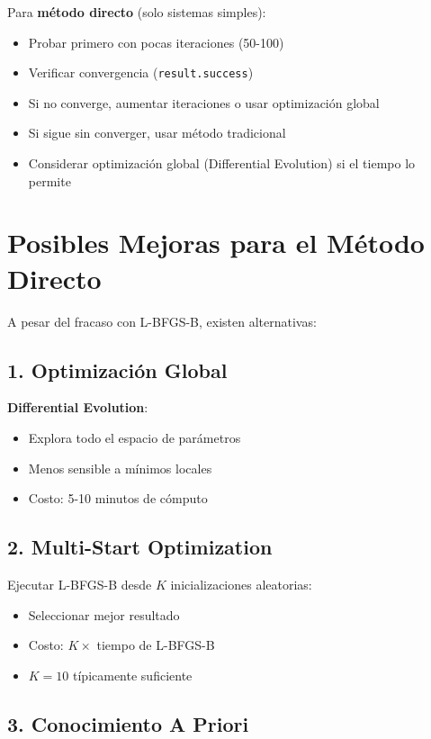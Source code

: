 \documentclass[11pt,a4paper]{article}
\begin{document}
Para \textbf{método directo} (solo sistemas simples):
\begin{itemize}
\item Probar primero con pocas iteraciones (50-100)
\item Verificar convergencia (\texttt{result.success})
\item Si no converge, aumentar iteraciones o usar optimización global
\item Si sigue sin converger, usar método tradicional
\item Considerar optimización global (Differential Evolution) si el tiempo lo permite
\end{itemize}

\section{Posibles Mejoras para el Método Directo}

A pesar del fracaso con L-BFGS-B, existen alternativas:

\subsection{1. Optimización Global}

\textbf{Differential Evolution}:
\begin{itemize}
\item Explora todo el espacio de parámetros
\item Menos sensible a mínimos locales
\item Costo: 5-10 minutos de cómputo
\end{itemize}

\subsection{2. Multi-Start Optimization}

Ejecutar L-BFGS-B desde $K$ inicializaciones aleatorias:
\begin{itemize}
\item Seleccionar mejor resultado
\item Costo: $K \times$ tiempo de L-BFGS-B
\item $K = 10$ típicamente suficiente
\end{itemize}

\subsection{3. Conocimiento A Priori}
\end{document}
